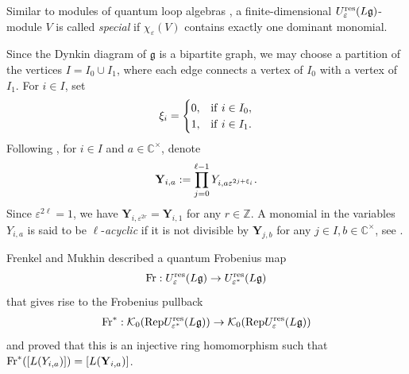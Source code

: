 \documentclass[12pt, reqno]{amsart}
\numberwithin{equation}{section}
\newcommand{\res}{{\rm res}}
\begin{document}
Similar to modules of quantum loop algebras \cite[Section 2.3]{MY12a}, a finite-dimensional $U_\varepsilon^{\res}(L\mathfrak{g})$-module $V$ is called \textit{special} if $\chi_{\varepsilon}(V)$ contains exactly one dominant monomial.

Since the Dynkin diagram of $\mathfrak{g}$ is a bipartite graph, we may choose a partition of the vertices $I=I_0\cup I_1$, where each edge connects a vertex of $I_0$ with a vertex of $I_1$. For $i\in I$, set
\begin{align}\label{Def: xi_i}
\xi_i=
\begin{cases} 0, & \text{if}{\hskip 0.4em} i\in I_0,\\
              1, & \text{if}{\hskip 0.4em} i\in I_1.
\end{cases}
\end{align}
Following \cite{FM02}, for $i\in I$ and $a\in \mathbb{C^{\times}}$, denote
\begin{align}\label{mathbf{Y}}
\mathbf{Y}_{i,a}:=\prod_{j=0}^{\ell-1} Y_{i,a\varepsilon^{2j+\xi_i}}.
\end{align}
Since $\varepsilon^{2\ell}=1$, we have $\mathbf{Y}_{i,\varepsilon^{2r}}=\mathbf{Y}_{i,1}$ for any $r\in \mathbb{Z}$. A monomial in the variables $Y_{i,a}$ is said to be $\ell$-\textit{acyclic} if it is not divisible by $\mathbf{Y}_{j,b}$ for any $j \in I, b\in \mathbb{C}^{\times}$, see \cite[Section 2.6]{FM02}.

Frenkel and Mukhin {\cite[Section 4]{FM02}} described a quantum Frobenius map
\[
{\rm Fr}:  U_\varepsilon^{\res}({L\mathfrak{g}})\rightarrow U_{{\varepsilon}^{\ast}}^{\res}({L\mathfrak{g}})
\]
that gives rise to the Frobenius pullback
\begin{align*}
{\rm Fr}^{\ast}: \mathcal{K}_0({\rm Rep} U_{{\varepsilon}^{\ast}}^{\res}({L\mathfrak{g}}))\rightarrow \mathcal{K}_0({\rm Rep} U_{{\varepsilon}}^{\res}({L\mathfrak{g}}))
\end{align*}
and proved that this is an injective ring homomorphism such that ${\rm Fr}^{\ast}([L(Y_{i,a})])=[L(\mathbf{Y}_{i,a})]$.
\end{document}
